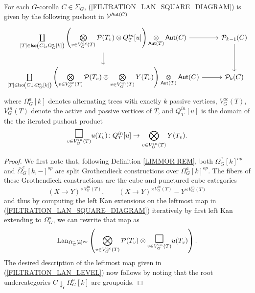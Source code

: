 \documentclass[a4paper,10pt]{article}%
\begin{document}
\begin{proposition}
For each $G$-corolla $C \in \Sigma_G$,
(\ref{FILTRATION_LAN_SQUARE_DIAGRAM})
is given by the following pushout in $\mathcal V^{\mathsf{Aut}(C)}$
\begin{equation}\label{FILTRATION_LAN_LEVEL}
\begin{tikzcd}
	\coprod\limits_{[T] \in \mathsf{Iso}
		\left(C \downarrow_{\mathsf{r}} \Omega_G^a[k]\right)}
	\left(
		\bigotimes\limits_{v \in V_{G}^{ac}(T)}\P(T_v) \otimes
		Q_T^{in}[u]
	\right)
		\mathop{\otimes}\limits_{\mathsf{Aut}(T)} \mathsf{Aut}(C)
	\arrow[r] \arrow[d] &
	\P_{k-1}(C) \arrow[d] 
\\
	\coprod\limits_{[T] \in \mathsf{Iso}
		\left(C \downarrow_{\mathsf{r}} \Omega_G^a[k]\right)}
	\left(
		\bigotimes\limits_{v \in V_{G}^{ac}(T)}\P(T_v) \otimes
		\bigotimes\limits_{v \in V_{G}^{in}(T)} Y(T_v)
	\right)
		\underset{\mathsf{Aut}(T)}{\otimes} \mathsf{Aut}(C)
	\arrow[r] &
	\P_k(C)
\end{tikzcd}
\end{equation}
where $\Omega_G^a[k]$ denotes alternating trees with exactly $k$ 
passive vertices, $ V_{G}^{ac}(T)$, $V_{G}^{in}(T)$ denote the active and passive vertices of $T$,
and $Q_T^{in}[u]$ is the domain 
of the the iterated pushout product
\[
		\underset{v \in V_G^{in}(T)}
		{\mathlarger{\mathlarger{\mathlarger{\square}}}}u(T_v)
	\colon
		Q_T^{in}[u] \to
		\bigotimes\limits_{v \in V_{G}^{in}(T)} Y(T_v).
\]
\end{proposition}


\begin{proof}
We first note that, following 
Definition \ref{LIMMOR REM}, both 
$\bar{\Omega}_{G}^e[k]^{op}$ and $\bar{\Omega}_{G}^e[k,-]^{op}$
are split Grothendieck constructions over
$\Omega_G^a[k]^{op}$.
The fibers of these Grothendieck constructions
are the cube and punctured cube categories
\[
	(X \to Y)^{\times V_G^{in}(T)},
\qquad
	(X \to Y)^{\times V_G^{in}(T)} - Y^{\times V_G^{in}(T)}
\]
and thus by computing the left Kan extensions on the leftmost map in (\ref{FILTRATION_LAN_SQUARE_DIAGRAM}) iteratively by first left Kan extending to $\Omega_G^a$, we can rewrite that map as
\begin{equation}\label{FILTINTALT EQ}
	\Lan_{\Omega_G^a[k]^{op}}
	\left(
		\bigotimes\limits_{v \in V_{G}^{ac}(T)}\P(T_v) \otimes
		\underset{v \in V_{G}^{in}(T)}
		{\mathlarger{\mathlarger{\mathlarger{\square}}}}
		u(T_v)
	\right).
\end{equation}
The desired description of the leftmost map given in (\ref{FILTRATION_LAN_LEVEL})
now follows by noting that the root undercategories
$C \downarrow_{\mathsf{r}} \Omega_G^a[k]$
are groupoids.
\end{proof}
\end{document}
